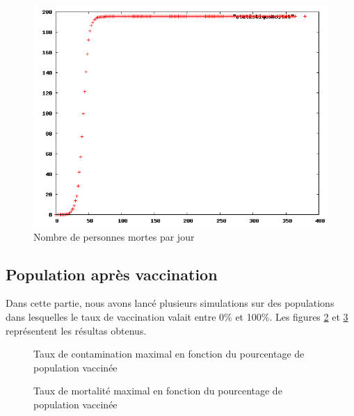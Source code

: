 \documentclass[12pt,a4paper,titlepage]{report}
\begin{document}
\begin{figure}[h]
  \centering
  \includegraphics[width=15cm]{1-1-statistiqueMo.png}
  \caption{Nombre de personnes mortes par jour}
  \label{fig:1-1-nb-morts}
\end{figure}

\subsection*{Population après vaccination}
Dans cette partie, nous avons lancé plusieurs simulations sur des populations dans 
lesquelles  le taux de vaccination valait entre 0\% et 100\%. Les figures  \ref{fig:1-2-nb-malades} 
et \ref{fig:1-2-nb-morts} représentent les résultas obtenus.

\begin{figure}[h]
  \centering
  \caption{Taux de contamination maximal en fonction du pourcentage de population vaccinée}
  \label{fig:1-2-nb-malades}
\end{figure}

 \begin{figure}[h]
  \centering
  \caption{Taux de mortalité maximal en fonction du pourcentage de population vaccinée}
  \label{fig:1-2-nb-morts}
\end{figure}
\end{document}
